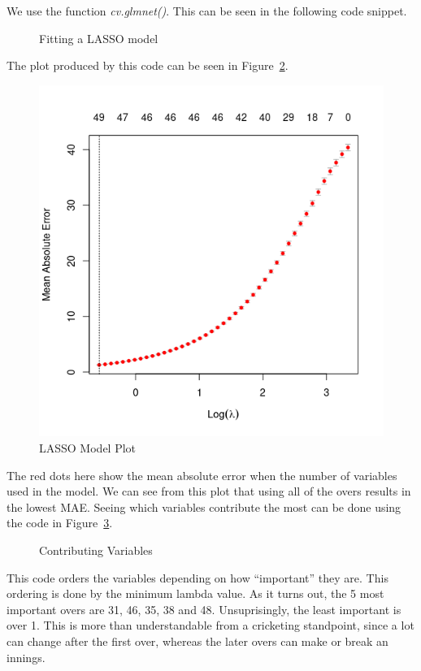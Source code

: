 We use the function \textit{cv.glmnet()}. This can be seen in the following code snippet.

\begin{figure}[h]
    
    \caption{Fitting a LASSO model}
    \label{lassoCode}
\end{figure}

The plot produced by this code can be seen in Figure~\ref{lassoFig}.

\begin{figure}[h]
    \centering
    \includegraphics[width=0.5\linewidth]{figures/lasso.png}
    \caption{LASSO Model Plot}
    \label{lassoFig}
\end{figure}

The red dots here show the mean absolute error when the number of variables used in the model. We can see from this plot that using all of the overs results in the lowest MAE. Seeing which variables contribute the most can be done using the code in Figure~\ref{lassoVals}. 

\begin{figure}[h]
    
    \caption{Contributing Variables}
    \label{lassoVals}
\end{figure}

This code orders the variables depending on how ``important'' they are. This ordering is done by the minimum lambda value. As it turns out, the 5 most important overs are 31, 46, 35, 38 and 48. Unsuprisingly, the least important is over 1. This is more than understandable from a cricketing standpoint, since a lot can change after the first over, whereas the later overs can make or break an innings. 


